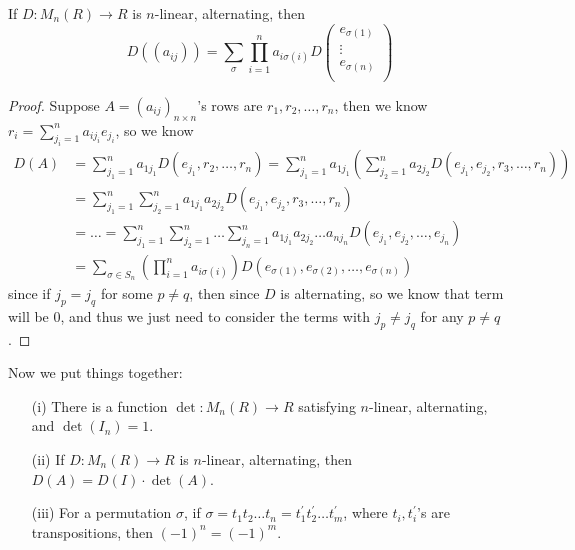 \begin{prev}
    If \(D: M_n(R) \to R\) is \(n\)-linear, alternating, then 
    \[
        D \left( (a_{ij}) \right) = \sum_{\sigma } \prod _{i=1}^n a_{i \sigma (i)} D \begin{pmatrix}
             e_{\sigma (1)} \\
             \vdots \\
             e_{\sigma (n)} \\
        \end{pmatrix}  
    \]  
\end{prev}
\begin{proof}
    Suppose \(A = (a_{ij})_{n \times n}\)'s rows are \(r_1, r_2, \dots , r_n\), then we know \(r_i = \sum_{j_i = 1}^n a_{i j_i} e_{j_i} \), so we know 
    \begin{align*}
        D(A) &= \sum_{j_1 = 1}^n a_{1 j_1} D(e_{j_1}, r_2, \dots , r_n) = \sum_{j_1 = 1}^n a_{1 j_1} \left( \sum_{j_2 = 1}^n a_{2 j_2} D(e_{j_1}, e_{j_2}, r_3, \dots, r_n )   \right) \\
        &= \sum_{j_1 = 1}^n \sum_ {j_2 = 1}^n a_{1 j_1} a_{2 j_2} D(e_{j_1}, e_{j_2}, r_3, \dots , r_n) \\
        &= \dots = \sum_{j_1=1}^n \sum_{j_2=1}^n \dots \sum_{j_n = 1}^n a_{1j_1} a_{2 j_2} \dots a_{n j_n} D(e_{j_1}, e_{j_2}, \dots , e_{j_n}) \\
        &= \sum_{\sigma \in S_n} \left( \prod _{i=1}^n a_{i \sigma (i)} \right) D(e_{\sigma (1)}, e_{\sigma (2)}, \dots , e_{\sigma (n)})        
    \end{align*}    
    since if \(j_p = j_q\) for some \(p \neq q\), then since \(D\) is alternating, so we know that term will be \(0\), and thus we just need to consider the terms with \(j_p \neq j_q\) for any \(p \neq q\).     
\end{proof}

Now we put things together: 
\begin{theorem}
    \vphantom{text}
    \begin{itemize}
        \item [(i)] There is a function \(\det : M_n(R) \to R\) satisfying \(n\)-linear, alternating, and \(\det (I_n) = 1\). 
        \item [(ii)] If \(D: M_n(R) \to R\) is \(n\)-linear, alternating, then \(D(A) = D(I) \cdot \det (A)\).
        \item [(iii)] For a permutation \(\sigma \), if \(\sigma = t_1 t_2\dots t_n = t_1^{\prime} t_2^{\prime} \dots t_m^{\prime} \), where \(t_i, t_i^{\prime} \)'s are transpositions, then \((-1)^n = (-1)^m\).        
    \end{itemize}
\end{theorem}

